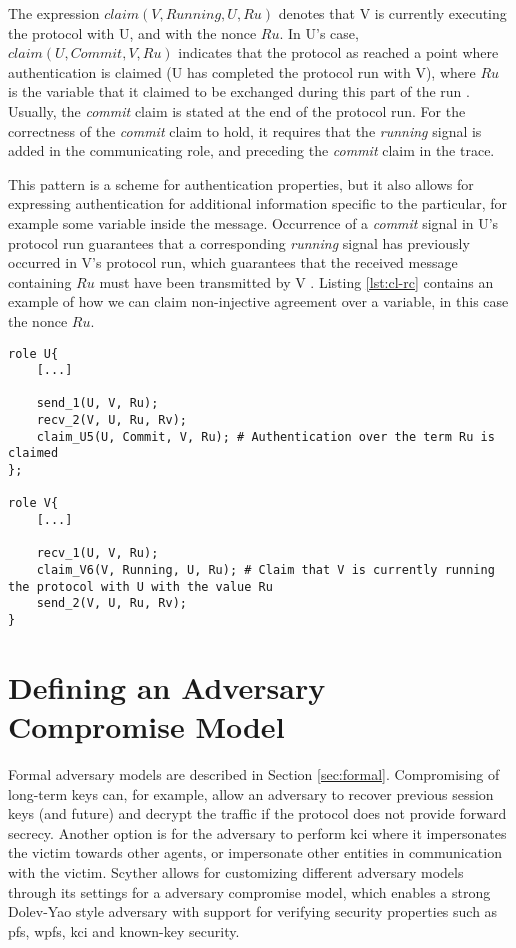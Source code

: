 The expression $claim(V, Running, U, Ru)$ denotes that V is currently executing the protocol with U, and with the nonce $Ru$. In U's case, $claim(U, Commit, V, Ru)$ indicates that the protocol as reached a point where authentication is claimed (U has completed the protocol run with V), where $Ru$ is the variable that it claimed to be exchanged during this part of the run \cite{ryan2001modelling}. Usually, the \emph{commit} claim is stated at the end of the protocol run. For the correctness of the \emph{commit} claim to hold, it requires that the \emph{running} signal is added in the communicating role, and preceding the \emph{commit} claim in the trace.

This pattern is a scheme for authentication properties, but it also allows for expressing authentication for additional information specific to the particular, for example some variable inside the message. Occurrence of a \emph{commit} signal in U's protocol run guarantees that a corresponding \emph{running} signal has previously occurred in V's protocol run, which guarantees that the received message containing $Ru$ must have been transmitted by V \cite{ryan2001modelling}. Listing \ref{lst:cl-rc} contains an example of how we can claim non-injective agreement over a variable, in this case the nonce $Ru$. 
\newline
\newpage
\begin{lstlisting}[caption={Example of a running, commit claim in Scyther to provide authentication for a set of terms.}, label={lst:cl-rc}]
role U{
	[...]
	
	send_1(U, V, Ru);
	recv_2(V, U, Ru, Rv);
	claim_U5(U, Commit, V, Ru); # Authentication over the term Ru is claimed
};

role V{
	[...]
	
	recv_1(U, V, Ru);
	claim_V6(V, Running, U, Ru); # Claim that V is currently running the protocol with U with the value Ru
	send_2(V, U, Ru, Rv); 
}
\end{lstlisting}

\section{Defining an Adversary Compromise Model}


Formal adversary models are described in Section \ref{sec:formal}. Compromising of long-term keys can, for example, allow an adversary to recover previous session keys (and future) and decrypt the traffic if the protocol does not provide forward secrecy. Another option is for the adversary to perform \gls{kci} where it impersonates the victim towards other agents, or impersonate other entities in communication with the victim. Scyther allows for customizing different adversary models through its settings for a adversary compromise model, which enables a strong Dolev-Yao style adversary with support for verifying security properties such as \gls{pfs}, \gls{wpfs}, \gls{kci} and known-key security. 

